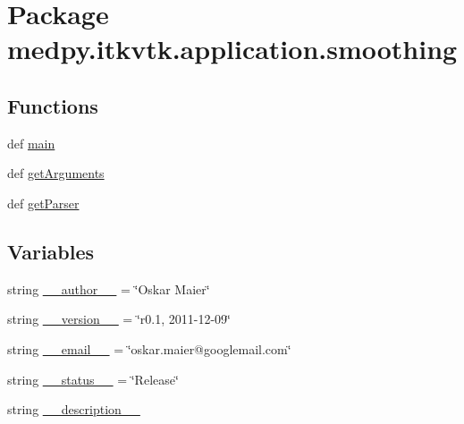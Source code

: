 \hypertarget{namespacemedpy_1_1itkvtk_1_1application_1_1smoothing}{
\section{Package medpy.itkvtk.application.smoothing}
\label{namespacemedpy_1_1itkvtk_1_1application_1_1smoothing}
}
\subsection*{Functions}
\begin{DoxyCompactItemize}
\item 
def \hyperlink{namespacemedpy_1_1itkvtk_1_1application_1_1smoothing_ae0e556a28e297e7dc0735422458f377d}{main}
\item 
def \hyperlink{namespacemedpy_1_1itkvtk_1_1application_1_1smoothing_a2021c2e255974612f820dc16ef9d7a30}{getArguments}
\item 
def \hyperlink{namespacemedpy_1_1itkvtk_1_1application_1_1smoothing_a0ac61d4886b388d1cd4a697c80530c83}{getParser}
\end{DoxyCompactItemize}
\subsection*{Variables}
\begin{DoxyCompactItemize}
\item 
string \hyperlink{namespacemedpy_1_1itkvtk_1_1application_1_1smoothing_a21dc459f8206634a80975c36f839245f}{\_\-\_\-author\_\-\_\-} = \char`\"{}Oskar Maier\char`\"{}
\item 
string \hyperlink{namespacemedpy_1_1itkvtk_1_1application_1_1smoothing_a177e8fcf326df5e6b73ba3ba05c7ce5a}{\_\-\_\-version\_\-\_\-} = \char`\"{}r0.1, 2011-\/12-\/09\char`\"{}
\item 
string \hyperlink{namespacemedpy_1_1itkvtk_1_1application_1_1smoothing_a42abb1df03fedc7d5aef1e83b9766692}{\_\-\_\-email\_\-\_\-} = \char`\"{}oskar.maier@googlemail.com\char`\"{}
\item 
string \hyperlink{namespacemedpy_1_1itkvtk_1_1application_1_1smoothing_ae438a9f918ff1bc154948aef74d4a51c}{\_\-\_\-status\_\-\_\-} = \char`\"{}Release\char`\"{}
\item 
string \hyperlink{namespacemedpy_1_1itkvtk_1_1application_1_1smoothing_aafc7d3312cb186122d204535323667b7}{\_\-\_\-description\_\-\_\-}
\end{DoxyCompactItemize}


